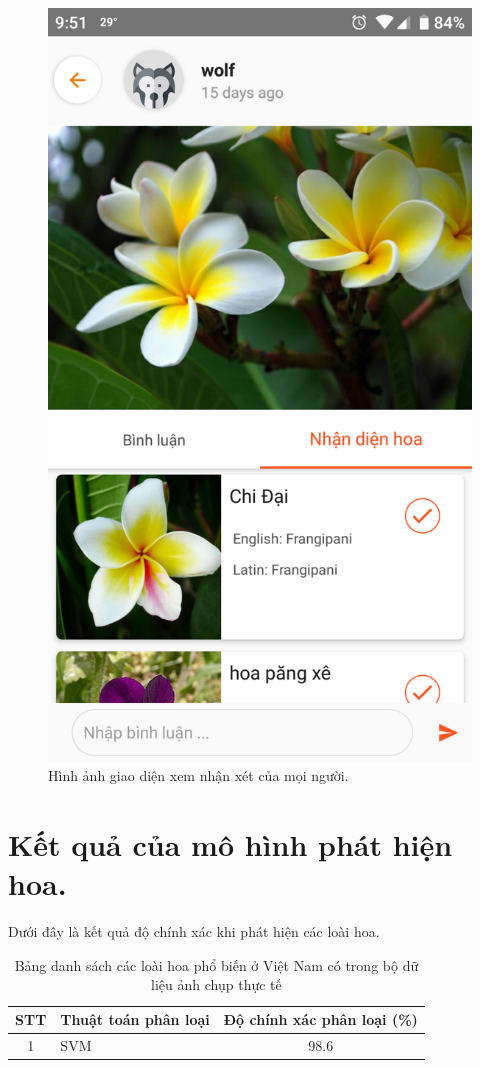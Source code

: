 \documentclass[12pt]{report}
\begin{document}
\begin{figure}[h]
			\includegraphics[scale=0.2]{app_comment2}
			\caption{Hình ảnh giao diện xem nhận xét của mọi người.}
			\label{fig:app_comment}
		\end{figure}
				
		\newpage
		\section{Kết quả của mô hình phát hiện hoa.}
		Dưới đây là kết quả độ chính xác khi phát hiện các loài hoa.
		\begin{table}[h]
			\centering
			\caption{Bảng danh sách các loài hoa phổ biến ở Việt Nam có trong bộ dữ liệu ảnh chụp thực tế}
			\label{tbl:table ket qua detect flower}
			\begin{tabular}{|c|l|c|}
				\hline
				\textbf{STT} & \textbf{Thuật toán phân loại} & \textbf{Độ chính xác phân loại (\%)} \\ \hline
				1            & SVM                                 & 98.6                                         \\ \hline   			
			\end{tabular}
		\end{table}
				
\end{document}
